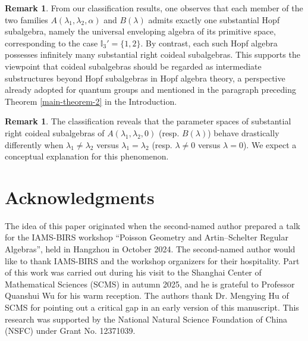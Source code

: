 \documentclass{article}
\theoremstyle{plain}
\theoremstyle{definition}
\newtheorem{remark}[thm]{Remark}
\numberwithin{equation}{section}
\newcommand{\II}{\mathbb{I}}
\begin{document}
	\begin{remark}
		From our classification results, one observes that each member of the two families $A(\lambda_{1},\lambda_{2},\alpha)$ and $B(\lambda)$ admits exactly one substantial Hopf subalgebra, namely the universal enveloping algebra of its primitive space, corresponding to the case $\II_{3}'=\{1,2\}$. By contrast, each such Hopf algebra possesses infinitely many substantial right coideal subalgebras. This supports the viewpoint that coideal subalgebras should be regarded as intermediate substructures beyond Hopf subalgebras in Hopf algebra theory, a perspective already adopted for quantum groups and mentioned in the paragraph preceding Theorem \ref{main-theorem-2} in the Introduction.
	\end{remark}
	
	\begin{remark}
		The classification reveals that the parameter spaces of substantial right coideal subalgebras of $A(\lambda_{1},\lambda_{2},0)$ (resp. $B(\lambda)$) behave drastically differently when $\lambda_{1}\neq \lambda_{2}$ versus $\lambda_{1}=\lambda_{2}$ (resp. $\lambda\neq 0$ versus $\lambda=0$). We expect a conceptual explanation for this phenomenon.
	\end{remark}
	
	
	\section*{Acknowledgments}
	The idea of this paper originated when the second-named author prepared a talk for the IAMS-BIRS workshop “Poisson Geometry and Artin–Schelter Regular Algebras”, held in Hangzhou in October 2024. The second-named author would like to thank IAMS-BIRS and the workshop organizers for their hospitality. Part of this work was carried out during his visit to the Shanghai Center of Mathematical Sciences (SCMS) in autumn 2025, and he is grateful to Professor Quanshui Wu for his warm reception. The authors thank Dr. Mengying Hu of SCMS for pointing out a critical gap in an early version of this manuscript. This research was supported by the National Natural Science Foundation of China (NSFC) under Grant No. 12371039.
	

	
	
\end{document}
